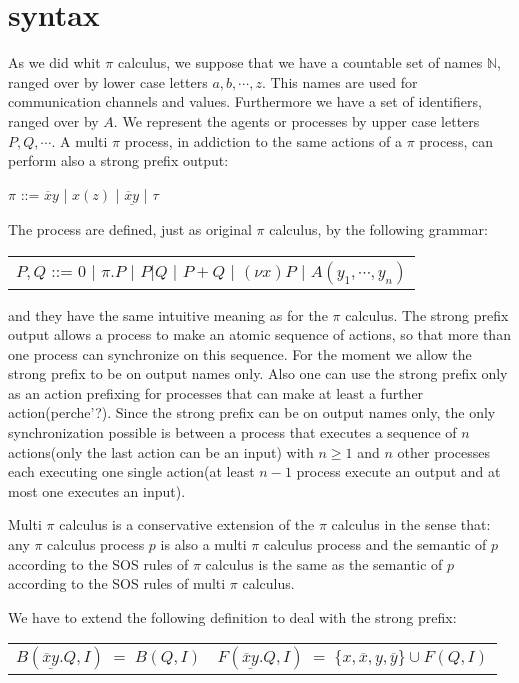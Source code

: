 
\section{syntax}
As we did whit $\pi$ calculus, we suppose that we have a countable set of names $\mathbb{N}$, ranged over by lower case letters $a,b, \cdots, z$. This names are used for communication channels and values. Furthermore we have a set of identifiers, ranged over by $A$. We represent the agents or processes by upper case letters $P,Q, \cdots $. A multi $\pi$ process, in addiction to the same actions of a $\pi$ process, can perform also a strong prefix output:
\begin{center}
  $\pi$ ::= $\overline{x}y$ | $x(z)$ | $\underline{\overline{x}y}$ | $\tau$ 
\end{center}
The process are defined, just as original $\pi$ calculus, by the following grammar:
\begin{center}
  \begin{tabular}{l}
    $P,Q$ ::= $0$ | $\pi.P$ | $P|Q$ | $P+Q$ | $(\nu x) P$ | $A(y_{1}, \cdots, y_{n})$
  \end{tabular}
\end{center}
and they have the same intuitive meaning as for the $\pi$ calculus. The strong prefix output allows a process to make an atomic sequence of actions, so that more than one process can synchronize on this sequence. For the moment we allow the strong prefix to be on output names only. Also one can use the strong prefix only as an action prefixing for processes that can make at least a further action(perche'?). Since the strong prefix can be on output names only, the only synchronization possible is between a process that executes a sequence of $n$ actions(only the last action can be an input) with $n\geq 1$ and $n$ other processes each executing one single action(at least $n-1$ process execute an output and at most one executes an input).

Multi $\pi$ calculus is a conservative extension of the $\pi$ calculus in the sense that: any $\pi$ calculus process $p$ is also a multi $\pi$ calculus process and the semantic of $p$ according to the SOS rules of $\pi$ calculus is the same as the semantic of $p$ according to the SOS rules of multi $\pi$ calculus. 

We have to extend the following definition to deal with the strong prefix:
\begin{center}
  \begin{tabular}{ll}
	$B(\underline{\overline{x}y}.Q, I)\; =\; B(Q,I)$
      &
	$F(\underline{\overline{x}y}.Q, I)\; =\; \{x,\overline{x},y,\overline{y}\}\cup F(Q, I)$
    \\
  \end{tabular}
\end{center}


